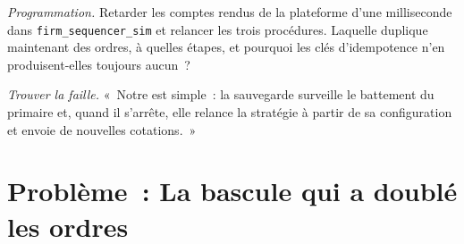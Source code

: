 \begin{exercise}[$\star\star\star$]\label{exo:ll:resilience:7}
\emph{Programmation.} Retarder les comptes rendus de la plateforme d'une milliseconde dans \texttt{firm\_sequencer\_sim} et relancer les trois procédures.
Laquelle duplique maintenant des ordres, à quelles étapes, et pourquoi les clés d'idempotence n'en produisent-elles toujours aucun~?
\end{exercise}

\begin{exercise}[$\star\star\star$]\label{exo:ll:resilience:8}
\emph{Trouver la faille.} «~Notre  est simple~: la sauvegarde surveille le battement du primaire et, quand il s'arrête, elle
relance la stratégie à partir de sa configuration et envoie de nouvelles cotations.~»
\end{exercise}

\section{Problème~: La bascule qui a doublé les ordres}

